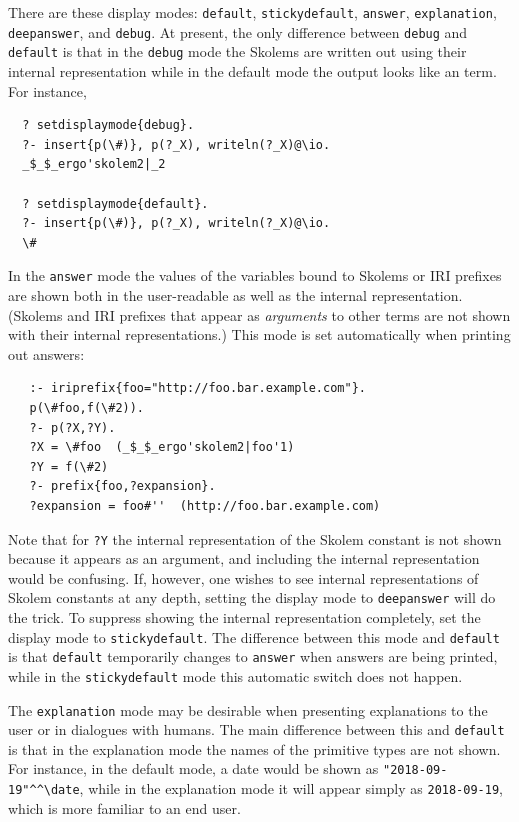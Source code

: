 \documentclass[11pt]{article}
\newcommand{\ERGO}{\mbox{\smaller{\ensuremath{\cal{E}}\smaller{{\sc{RGO}}}}}\xspace}
\newcommand{\FLSYSTEM}{\ERGO}
\begin{document}
There are these display modes:
\texttt{default}, \texttt{stickydefault},
\texttt{answer}, \texttt{explanation},
\texttt{deepanswer},  and \texttt{debug}.
At present, the only difference between \texttt{debug} and \texttt{default}
is that in the \texttt{debug} mode
the Skolems are written out using their internal representation while in
the default mode the output looks like an \FLSYSTEM term.
For instance,
\begin{verbatim}
  ? setdisplaymode{debug}.
  ?- insert{p(\#)}, p(?_X), writeln(?_X)@\io.
  _$_$_ergo'skolem2|_2

  ? setdisplaymode{default}.
  ?- insert{p(\#)}, p(?_X), writeln(?_X)@\io.
  \#
\end{verbatim}
In the \texttt{answer} mode the values of the
variables bound to Skolems or IRI prefixes are shown
both in the user-readable as well as the internal representation. 
(Skolems and IRI prefixes that appear as \emph{arguments} to other terms are not shown with their
internal representations.)
This mode is set automatically when printing out answers:
\begin{verbatim}
   :- iriprefix{foo="http://foo.bar.example.com"}.
   p(\#foo,f(\#2)).
   ?- p(?X,?Y).
   ?X = \#foo  (_$_$_ergo'skolem2|foo'1)
   ?Y = f(\#2)
   ?- prefix{foo,?expansion}.
   ?expansion = foo#''  (http://foo.bar.example.com)
\end{verbatim}
Note that for \texttt{?Y} the internal representation of the Skolem
constant is not shown because it appears as an argument, and including the
internal representation would be confusing. If, however, one wishes to
see internal representations of Skolem constants at any depth, setting the
display mode to \texttt{deepanswer} will do the trick. 
To suppress showing the internal representation completely, set the display
mode to \texttt{stickydefault}. 
The difference between this mode and \texttt{default} is that
\texttt{default} temporarily changes to \texttt{answer} when answers are
being printed, while in the \texttt{stickydefault} mode this automatic
switch does not happen.

The \texttt{explanation} mode may be desirable when presenting explanations
to the user or in dialogues with humans.
The main difference between this and \texttt{default}
is that in the explanation mode the names of the primitive types are not
shown. For instance, in the default mode, a date would be shown as
\verb|"2018-09-19"^^\date|, while in the explanation mode it will appear
simply as \verb|2018-09-19|, which is more familiar to an end user.
\end{document}
